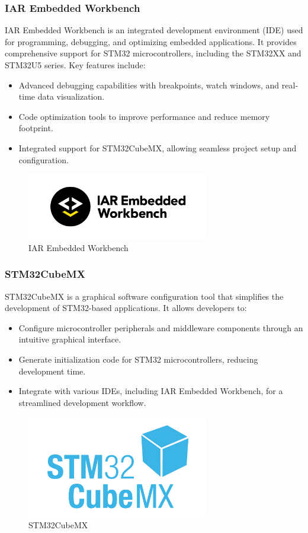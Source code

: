 \subsubsection{IAR Embedded Workbench}
IAR Embedded Workbench is an integrated development environment (IDE) used for programming, debugging, and optimizing embedded applications. It provides comprehensive support for STM32 microcontrollers, including the STM32XX and STM32U5 series. Key features include:
\begin{itemize}
    \item Advanced debugging capabilities with breakpoints, watch windows, and real-time data visualization.
    \item Code optimization tools to improve performance and reduce memory footprint.
    \item Integrated support for STM32CubeMX, allowing seamless project setup and configuration.
\end{itemize}
\begin{figure}[H]
  \centering
  \includegraphics[width=8cm]{img/IAR.png}
  \caption{IAR Embedded Workbench}
  \label{fig:IAR}
\end{figure}

\subsubsection{STM32CubeMX}
STM32CubeMX is a graphical software configuration tool that simplifies the development of STM32-based applications. It allows developers to:
\begin{itemize}
    \item Configure microcontroller peripherals and middleware components through an intuitive graphical interface.
    \item Generate initialization code for STM32 microcontrollers, reducing development time.
    \item Integrate with various IDEs, including IAR Embedded Workbench, for a streamlined development workflow.
\end{itemize}
\begin{figure}[H]
  \centering
  \includegraphics[width=8cm]{img/CUBEMX.jpg}
  \caption{STM32CubeMX}
  \label{fig:mx}
\end{figure}
